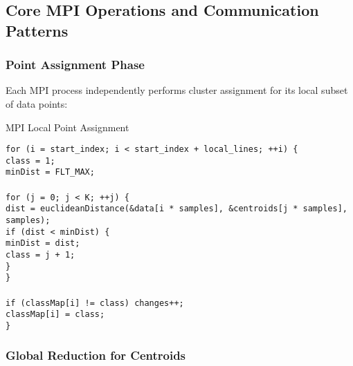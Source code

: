 \documentclass[12pt,a4paper]{article}
\begin{document}
\subsection{Core MPI Operations and Communication Patterns}

\subsubsection{Point Assignment Phase}

Each MPI process independently performs cluster assignment for its local subset of data points:

\begin{algorithm}[H]
\caption{MPI Local Point Assignment}
\label{alg:mpi_assignment}
\begin{flushleft}
\texttt{for (i = start\_index; i < start\_index + local\_lines; ++i) \{}\\
\hspace{1cm}\texttt{class = 1;}\\
\hspace{1cm}\texttt{minDist = FLT\_MAX;}\\
\\
\hspace{1cm}\texttt{for (j = 0; j < K; ++j) \{}\\
\hspace{2cm}\texttt{dist = euclideanDistance(\&data[i * samples], \&centroids[j * samples], samples);}\\
\hspace{2cm}\texttt{if (dist < minDist) \{}\\
\hspace{3cm}\texttt{minDist = dist;}\\
\hspace{3cm}\texttt{class = j + 1;}\\
\hspace{2cm}\texttt{\}}\\
\hspace{1cm}\texttt{\}}\\
\\
\hspace{1cm}\texttt{if (classMap[i] != class) changes++;}\\
\hspace{1cm}\texttt{classMap[i] = class;}\\
\texttt{\}}
\end{flushleft}
\end{algorithm}

\subsubsection{Global Reduction for Centroids}
\end{document}
